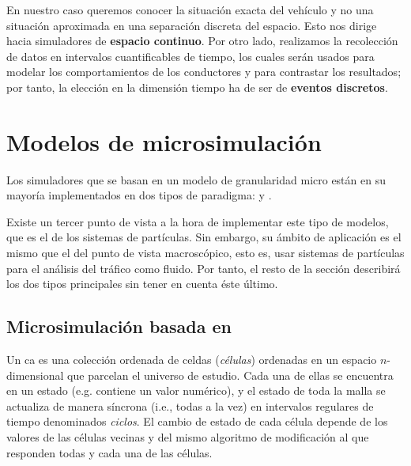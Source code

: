 En nuestro caso queremos conocer la situación exacta del vehículo y no una situación aproximada en una separación discreta del espacio. Esto nos dirige hacia simuladores de \textbf{espacio continuo}. Por otro lado, realizamos la recolección de datos en intervalos cuantificables de tiempo, los cuales serán usados para modelar los comportamientos de los conductores y para contrastar los resultados; por tanto, la elección en la dimensión tiempo ha de ser de \textbf{eventos discretos}.

\section{Modelos de microsimulación}

Los simuladores que se basan en un modelo de granularidad micro están en su mayoría implementados en dos tipos de paradigma:  y .

Existe un tercer punto de vista a la hora de implementar este tipo de modelos, que es el de los sistemas de partículas. Sin embargo, su ámbito de aplicación es el mismo que el del punto de vista macroscópico, esto es, usar sistemas de partículas para el análisis del tráfico como fluido. Por tanto, el resto de la sección describirá los dos tipos principales sin tener en cuenta éste último.

\subsection{Microsimulación basada en }

Un \ac{ca} es una colección ordenada de celdas (\textit{células}) ordenadas en un espacio $n$-dimensional que parcelan el universo de estudio. Cada una de ellas se encuentra en un estado (e.g. contiene un valor numérico), y el estado de toda la malla se actualiza de manera síncrona (i.e., todas a la vez) en intervalos regulares de tiempo denominados \textit{ciclos}. El cambio de estado de cada célula depende de los valores de las células vecinas y del mismo algoritmo de modificación al que responden todas y cada una de las células.

